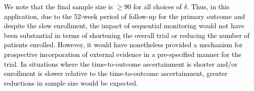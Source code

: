 \documentclass[12pt]{article}
\begin{document}
\textcolor{black}{We note that the final sample size is $\ge 90$ for all choices of $\delta$. Thus, in this application, due to the 52-week period of follow-up for the primary outcome and despite the slow enrollment, the impact of sequential monitoring would not have been substantial in terms of shortening the overall trial or reducing the number of patients enrolled. However, it would have nonetheless provided a mechanism for prospective incorporation of external evidence in a pre-specified manner for the trial. In situations where the time-to-outcome ascertainment is shorter and/or enrollment is slower relative to the time-to-outcome ascertainment, greater reductions in sample size would be expected.}
\end{document}
